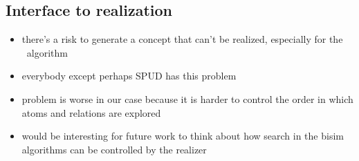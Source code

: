 \subsection{Interface to realization}

\begin{itemize}
\item there's a risk to generate a concept that can't be realized,
  especially for the \alc\ algorithm
\item everybody except perhaps SPUD has this problem
\item problem is worse in our case because it is harder to control the
  order in which atoms and relations are explored
\item would be interesting for future work to think about how
  search in the bisim algorithms can be controlled by the realizer
\end{itemize}

